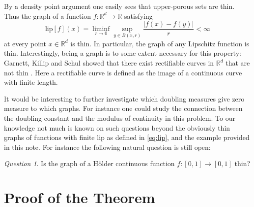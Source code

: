 \documentclass[reqno,12pt]{amsart}
\theoremstyle{plain}
\theoremstyle{remark}
\newtheorem{question}[theorem]{Question}
\begin{document}
By a density point argument one easily sees that upper-porous sets are thin. Thus the graph of a function $f \colon {\ensuremath{\mathbb{R}}}^d \to {\ensuremath{\mathbb{R}}}$ 
satisfying
\begin{equation}\label{eq:lip}
  \text{lip}[f](x) = \liminf_{r \to 0} \sup_{y \in B(x,r)}\frac{|f(x)-f(y)|}{r} < \infty
\end{equation}
at every point $x \in {\ensuremath{\mathbb{R}}}^d$ is thin.
In particular, the graph of any Lipschitz function is thin. Interestingly, being a graph is to some extent necessary
for this property: Garnett, Killip and Schul showed that there exist rectifiable curves in ${\ensuremath{\mathbb{R}}}^d$ that are not thin \cite{GarnettEtal2010}.
Here a rectifiable curve is defined as the image of a continuous curve with finite length.

It would be interesting to further investigate which doubling measures give zero measure to which graphs.
For instance one could study the connection between the doubling constant and the modulus of continuity in this problem.
To our knowledge not much is known on such questions beyond the obviously thin graphs of functions with finite $\text{lip}$
as defined in \eqref{eq:lip},
and the example provided in this note. For instance the following natural question is still open:

\begin{question}
  Is the graph of a H\"older continuous function $f:[0,1] \to [0,1]$ thin?
\end{question}

\section{Proof of the Theorem}
\end{document}
